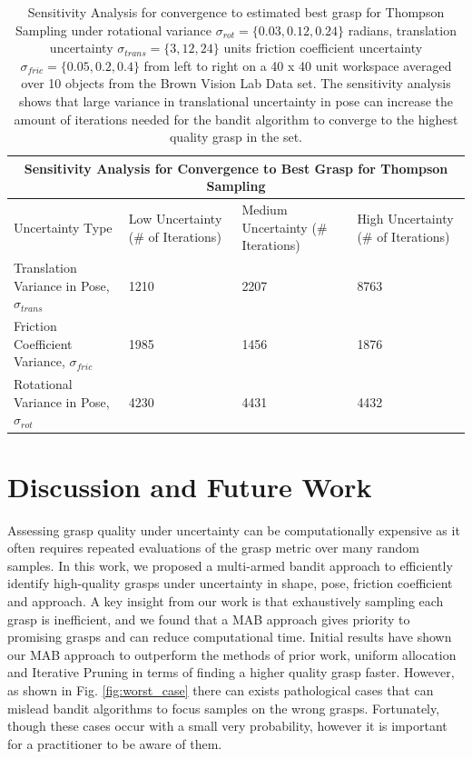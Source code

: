 \documentclass[10pt, conference]{ieeeconf}      %
\begin{document}
\begin{table}[t]
\centering
\begin{tabular}{ |p{4.5cm}||p{2cm}|p{2.5cm}|p{2cm}|  }
 \hline
 \multicolumn{4}{|c|}{Sensitivity Analysis for Convergence to Best Grasp for Thompson Sampling} \\
 \hline
Uncertainty Type & Low Uncertainty ($\#$ of Iterations) & Medium Uncertainty ($\#$ Iterations) & High Uncertainty ($\#$ of Iterations)\\
 \hline
Translation Variance in Pose, $\sigma_{trans}$ & 1210    & 2207 &  8763\\
Friction Coefficient Variance, $\sigma_{fric}$ &  1985  & 1456   & 1876\\
Rotational Variance in Pose, $\sigma_{rot}$ & 4230 & 4431 &  4432\\
 \hline
\end{tabular}
   \caption { \footnotesize  Sensitivity Analysis for convergence to estimated best grasp for Thompson Sampling under rotational variance $\sigma_{rot} = \lbrace 0.03,0.12, 0.24 \rbrace$ radians,  translation uncertainty $\sigma_{trans} = \lbrace 3, 12, 24 \rbrace$ units  friction coefficient uncertainty $\sigma_{fric} = \lbrace 0.05,0.2, 0.4 \rbrace$  from left to right on a 40 x 40 unit workspace averaged over 10 objects from the Brown Vision Lab Data set. The sensitivity analysis shows that large variance in translational uncertainty in pose can increase the amount of iterations needed for the bandit algorithm to converge to the highest quality grasp in the set. 
   }
\vspace*{-20pt}
\end{table}


\section{Discussion and Future Work } 

Assessing grasp quality under  uncertainty can be computationally expensive as it often requires repeated evaluations of the grasp metric over many random samples.
In this work, we proposed a multi-armed bandit approach to efficiently identify high-quality grasps under uncertainty in shape, pose, friction coefficient and approach. 
A key insight from our work is that exhaustively sampling each grasp is inefficient, and we found that a MAB approach gives priority to promising grasps and can reduce computational time. Initial results have shown our MAB approach to outperform the methods of prior work, uniform allocation and Iterative Pruning  \cite{kehoe2012toward}\cite{kehoe2012estimating} in terms of finding a higher quality grasp faster. 
 However, as shown in Fig. \ref{fig:worst_case} there can exists pathological cases that can mislead bandit algorithms to focus samples on the wrong grasps. Fortunately, though these cases occur with a small very probability, however it is important for a practitioner to be aware of them. 
\end{document}
